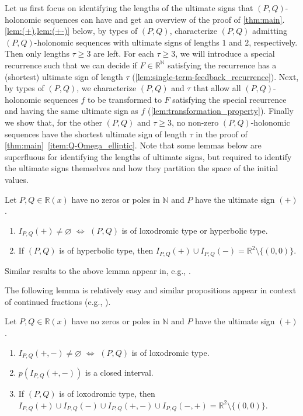 \documentclass[a4paper,UKenglish,cleveref,autoref,thm-restate]{lipics-v2021}
\newcommand{\R}{\mathbb{R}}
\newcommand{\N}{\mathbb{N}}
\begin{document}
Let us first focus on identifying the lengths of the ultimate signs that $(P, Q)$-holonomic sequences can have and get an overview of the proof of \cref{thm:main}. 
\cref{lem:(+),lem:(+-)} below, by types of $(P, Q)$, characterize $(P, Q)$ admitting $(P, Q)$-holonomic sequences with ultimate signs of lengths $1$ and $2$, respectively. Then only lengths $\tau \geq 3$ are left. For each $\tau \geq 3$, we will introduce a special recurrence such that we can decide if $F \in \R^{\N}$ satisfying the recurrence has a (shortest) ultimate sign of length $\tau$ (\cref{lem:single-term-feedback_recurrence}). 
Next, by types of $(P, Q)$, we characterize $(P, Q)$ and $\tau$ that allow all $(P, Q)$-holonomic sequences $f$ to be transformed to $F$ satisfying the special recurrence and having the same ultimate sign as $f$ (\cref{lem:transformation_property}). Finally we show that, for the other $(P, Q)$ and $\tau \geq 3$, no non-zero $(P, Q)$-holonomic sequences have the shortest ultimate sign of length $\tau$ in the proof of \cref{thm:main}~\eqref{item:Q-Omega_elliptic}. 
Note that some lemmas below are superfluous for identifying the lengths of ultimate signs, but required to identify the ultimate signs themselves and how they partition the space of the initial values.  


\begin{lemma} \label{lem:(+)}
    Let $P, Q \in \R(x)$ have no zeros or poles in $\N$ and $P$ have the ultimate sign $(+)$. 
    \begin{enumerate}[(1)]
        \item \label{item:condition_of_exist(+)}
        $I_{P, Q}(+) \neq \varnothing$
        $\iff$
        $(P, Q)$ is of loxodromic type or hyperbolic type.
        \item \label{item:(PQ):hyp->+or-}
        If $(P, Q)$ is of hyperbolic type, then $I_{P, Q}(+) \cup I_{P, Q}(-) = \R^2 \setminus \{(0, 0)\}$. 
    \end{enumerate}
\end{lemma}

Similar results to the above lemma appear in, e.g., \cite{KKL+21}.

The following lemma is relatively easy and similar propositions appear in context of continued fractions (e.g., \cite[Theorem~3.12]{LW08}). 

\begin{lemma} \label{lem:(+-)}
Let $P, Q \in \R(x)$ have no zeros or poles in $\N$ and $P$ have the ultimate sign $(+)$. 
\begin{enumerate}[(1)]
\item \label{item:exist(+-)}
$I_{P, Q}(+, -) \neq \varnothing$ $\iff$ $(P, Q)$ is of loxodromic type. 

\item \label{item:pI(+-)_is_closed}
$p(I_{P, Q}(+, -))$ is a closed interval. 

\item \label{item:(PQ):lox->+or-or+-or-+}
If $(P, Q)$ is of loxodromic type, then $I_{P, Q}(+) \cup I_{P, Q}(-) \cup I_{P, Q}(+, -) \cup I_{P, Q}(-, +) = \R^2 \setminus \{ (0, 0) \}$. 
\end{enumerate}
\end{lemma}
\end{document}
